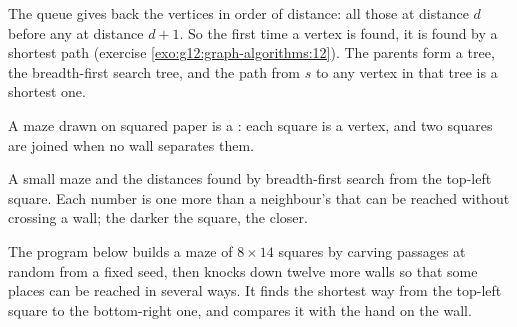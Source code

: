 \label{lst:g12:graph-algorithms:bfs}

\label{out:g12:graph-algorithms:bfs}

The queue gives back the vertices in order of distance: all those at distance $d$ before any at distance $d + 1$. So
the first time a vertex is found, it is found by a shortest path (exercise \ref{exo:g12:graph-algorithms:12}). The
parents form a tree, the breadth-first search tree, and the path from $s$ to any vertex in that tree is a shortest one.

A maze drawn on squared paper is a : each square is a vertex, and two squares are joined when no wall separates
them.

\begin{omfigure}

{\small A small maze and the distances found by breadth-first search from the top-left square. Each number is one
more than a neighbour's that can be reached without crossing a wall; the darker the square, the closer.}
\end{omfigure}

The program below builds a maze of $8 \times 14$ squares by carving passages at random from a fixed seed, then knocks
down twelve more walls so that some places can be reached in several ways. It finds the shortest way from the
top-left square to the bottom-right one, and compares it with the hand on the wall.

\label{lst:g12:graph-algorithms:maze}


